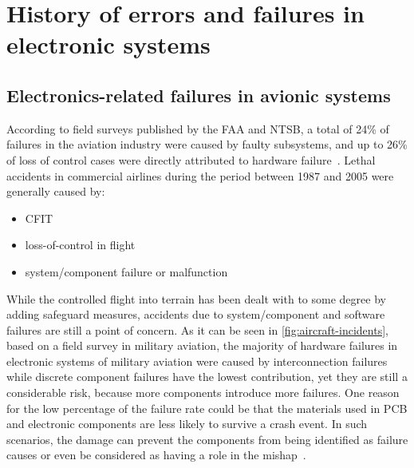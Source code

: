 
\section{History of errors and failures in electronic systems}
\label{sec:history-errors-failures-in-electronic-systems}

\subsection{Electronics-related failures in avionic systems}
\label{subsec:elec-failres-in-avionics}

According to field surveys published by the \ac{FAA} and \ac{NTSB}, a total
of 24\% of failures in the aviation industry were caused by faulty subsystems,
and up to 26\% of loss of control cases were directly attributed to
hardware failure~\autocite{belcastro}.
Lethal accidents in commercial airlines during the period between 1987 and 2005
were generally caused by:

\begin{itemize}[topsep=8pt,itemsep=4pt,partopsep=4pt, parsep=4pt]
    \item \ac{CFIT}
    \item loss-of-control in flight
    \item system/component failure or malfunction
\end{itemize}

While the controlled flight into terrain has been dealt with to some degree by
adding safeguard measures, accidents due to system/component and software
failures are still a point of concern.
As it can be seen in \autoref{fig:aircraft-incidents}, based on a field survey
in military aviation, the majority of hardware failures in electronic systems
of military aviation were caused by interconnection
failures~\autocite{norton-mishap} while discrete component failures have
the lowest contribution, yet they are still a considerable risk, because
more components introduce more failures.
One reason for the low percentage of the failure rate could be that the
materials used in \ac{PCB} and electronic components are less likely to survive
a crash event. In such scenarios, the damage can prevent the components from
being identified as failure causes or even be considered as having a role in
the mishap~\autocite{Galler}.

